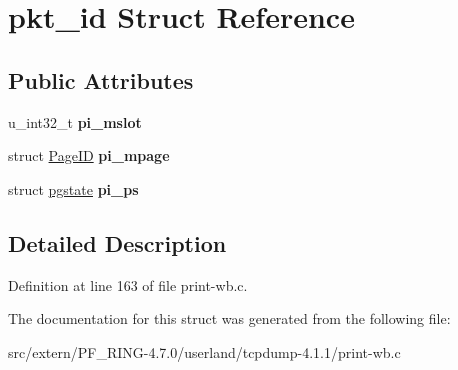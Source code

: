 \hypertarget{structpkt__id}{
\section{pkt\_\-id Struct Reference}
\label{structpkt__id}
}
\subsection*{Public Attributes}
\begin{DoxyCompactItemize}
\item 
\hypertarget{structpkt__id_a9acd06a38ba19a3af332fab300361834}{
u\_\-int32\_\-t {\bfseries pi\_\-mslot}}
\label{structpkt__id_a9acd06a38ba19a3af332fab300361834}

\item 
\hypertarget{structpkt__id_a5a36e5147a40c8881cbe3b9adb8f0706}{
struct \hyperlink{struct_page_i_d}{PageID} {\bfseries pi\_\-mpage}}
\label{structpkt__id_a5a36e5147a40c8881cbe3b9adb8f0706}

\item 
\hypertarget{structpkt__id_a43bc1b84c2a08bc371fb228a5cb0a59d}{
struct \hyperlink{structpgstate}{pgstate} {\bfseries pi\_\-ps}}
\label{structpkt__id_a43bc1b84c2a08bc371fb228a5cb0a59d}

\end{DoxyCompactItemize}


\subsection{Detailed Description}


Definition at line 163 of file print-\/wb.c.



The documentation for this struct was generated from the following file:\begin{DoxyCompactItemize}
\item 
src/extern/PF\_\-RING-\/4.7.0/userland/tcpdump-\/4.1.1/print-\/wb.c\end{DoxyCompactItemize}

